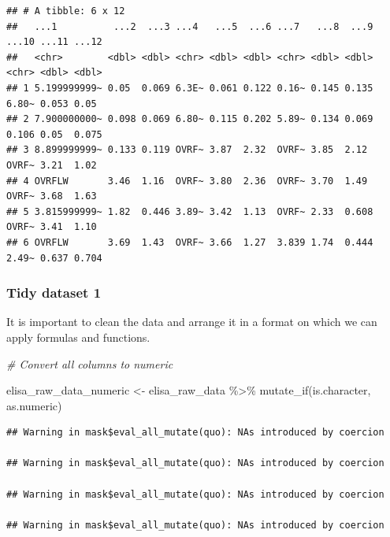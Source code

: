 \documentclass[
]{book}
\newenvironment{Shaded}{\begin{snugshade}}{\end{snugshade}}
\newcommand{\CommentTok}[1]{\textcolor[rgb]{0.56,0.35,0.01}{\textit{#1}}}
\newcommand{\FunctionTok}[1]{\textcolor[rgb]{0.00,0.00,0.00}{#1}}
\newcommand{\NormalTok}[1]{#1}
\newcommand{\OtherTok}[1]{\textcolor[rgb]{0.56,0.35,0.01}{#1}}
\newcommand{\SpecialCharTok}[1]{\textcolor[rgb]{0.00,0.00,0.00}{#1}}
\begin{document}
\begin{verbatim}
## # A tibble: 6 x 12
##   ...1          ...2  ...3 ...4   ...5  ...6 ...7   ...8  ...9 ...10 ...11 ...12
##   <chr>        <dbl> <dbl> <chr> <dbl> <dbl> <chr> <dbl> <dbl> <chr> <dbl> <dbl>
## 1 5.199999999~ 0.05  0.069 6.3E~ 0.061 0.122 0.16~ 0.145 0.135 6.80~ 0.053 0.05 
## 2 7.900000000~ 0.098 0.069 6.80~ 0.115 0.202 5.89~ 0.134 0.069 0.106 0.05  0.075
## 3 8.899999999~ 0.133 0.119 OVRF~ 3.87  2.32  OVRF~ 3.85  2.12  OVRF~ 3.21  1.02 
## 4 OVRFLW       3.46  1.16  OVRF~ 3.80  2.36  OVRF~ 3.70  1.49  OVRF~ 3.68  1.63 
## 5 3.815999999~ 1.82  0.446 3.89~ 3.42  1.13  OVRF~ 2.33  0.608 OVRF~ 3.41  1.10 
## 6 OVRFLW       3.69  1.43  OVRF~ 3.66  1.27  3.839 1.74  0.444 2.49~ 0.637 0.704
\end{verbatim}

\hypertarget{tidy-dataset-1}{%
\subsubsection{Tidy dataset 1}\label{tidy-dataset-1}}

It is important to clean the data and arrange it in a format on which we can apply formulas and functions.

\begin{Shaded}
\begin{Highlighting}[]
\CommentTok{\# Convert all columns to numeric}

\NormalTok{elisa\_raw\_data\_numeric }\OtherTok{\textless{}{-}}\NormalTok{ elisa\_raw\_data }\SpecialCharTok{\%\textgreater{}\%} 
  \FunctionTok{mutate\_if}\NormalTok{(is.character, as.numeric)}
\end{Highlighting}
\end{Shaded}

\begin{verbatim}
## Warning in mask$eval_all_mutate(quo): NAs introduced by coercion

## Warning in mask$eval_all_mutate(quo): NAs introduced by coercion

## Warning in mask$eval_all_mutate(quo): NAs introduced by coercion

## Warning in mask$eval_all_mutate(quo): NAs introduced by coercion
\end{verbatim}
\end{document}
